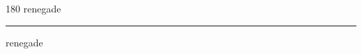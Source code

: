 
\begin{frame}
\begin{center}
\begin{turn}{180}
{\fontsize{2.5cm}{1em}\selectfont renegade}
\end{turn}
\vspace{1em}\par  
\hrule
\vspace{1em}\par  
{\fontsize{2.5cm}{1em}\selectfont renegade}
\end{center}
\end{frame}
